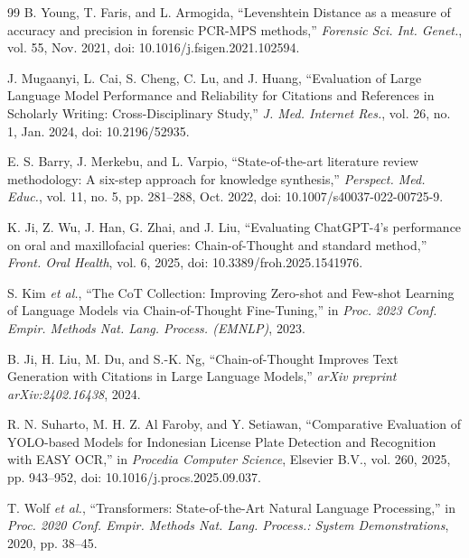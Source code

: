 \documentclass[10pt,a4paper]{article}
\begin{document}
\begin{thebibliography}{99}
B. Young, T. Faris, and L. Armogida, ``Levenshtein Distance as a measure of accuracy and precision in forensic PCR-MPS methods,'' \textit{Forensic Sci. Int. Genet.}, vol. 55, Nov. 2021, doi: 10.1016/j.fsigen.2021.102594.

J. Mugaanyi, L. Cai, S. Cheng, C. Lu, and J. Huang, ``Evaluation of Large Language Model Performance and Reliability for Citations and References in Scholarly Writing: Cross-Disciplinary Study,'' \textit{J. Med. Internet Res.}, vol. 26, no. 1, Jan. 2024, doi: 10.2196/52935.

E. S. Barry, J. Merkebu, and L. Varpio, ``State-of-the-art literature review methodology: A six-step approach for knowledge synthesis,'' \textit{Perspect. Med. Educ.}, vol. 11, no. 5, pp. 281--288, Oct. 2022, doi: 10.1007/s40037-022-00725-9.

K. Ji, Z. Wu, J. Han, G. Zhai, and J. Liu, ``Evaluating ChatGPT-4's performance on oral and maxillofacial queries: Chain-of-Thought and standard method,'' \textit{Front. Oral Health}, vol. 6, 2025, doi: 10.3389/froh.2025.1541976.

S. Kim \textit{et al.}, ``The CoT Collection: Improving Zero-shot and Few-shot Learning of Language Models via Chain-of-Thought Fine-Tuning,'' in \textit{Proc. 2023 Conf. Empir. Methods Nat. Lang. Process. (EMNLP)}, 2023.

B. Ji, H. Liu, M. Du, and S.-K. Ng, ``Chain-of-Thought Improves Text Generation with Citations in Large Language Models,'' \textit{arXiv preprint arXiv:2402.16438}, 2024.

R. N. Suharto, M. H. Z. Al Faroby, and Y. Setiawan, ``Comparative Evaluation of YOLO-based Models for Indonesian License Plate Detection and Recognition with EASY OCR,'' in \textit{Procedia Computer Science}, Elsevier B.V., vol. 260, 2025, pp. 943--952, doi: 10.1016/j.procs.2025.09.037.

T. Wolf \textit{et al.}, ``Transformers: State-of-the-Art Natural Language Processing,'' in \textit{Proc. 2020 Conf. Empir. Methods Nat. Lang. Process.: System Demonstrations}, 2020, pp. 38--45.

\end{thebibliography}
\endgroup
\end{document}
